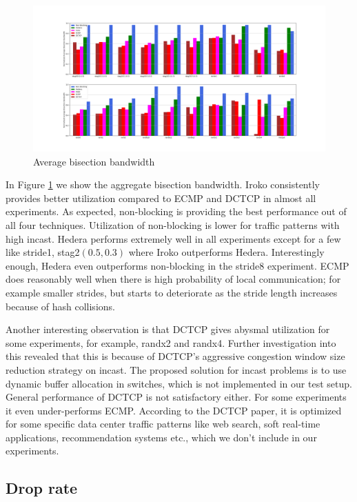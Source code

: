 \begin{figure}
	\centering
	\includegraphics[width=1\linewidth]{rate.png}
	\caption{Average bisection bandwidth}
	\label{fig:rate}
\end{figure}

In Figure \ref{fig:rate} we show the aggregate bisection bandwidth. Iroko
consistently provides better utilization compared to ECMP and DCTCP in almost
all experiments. As expected, non-blocking is providing the best performance out
of all four techniques. Utilization of non-blocking is lower for traffic
patterns with high incast. Hedera performs extremely well in all experiments
except for a few like stride1, stag2$(0.5,0.3)$ where Iroko outperforms Hedera.
Interestingly enough, Hedera even outperforms non-blocking in the stride8
experiment. ECMP does reasonably well when there is high probability of local
communication; for example smaller strides, but starts to deteriorate as the
stride length increases because of hash collisions.

Another interesting observation is that DCTCP gives abysmal utilization for some
experiments, for example, randx2 and randx4. Further investigation into this
revealed that this is because of DCTCP's aggressive congestion window size
reduction strategy on incast. The proposed solution for incast problems is to use
dynamic buffer allocation in switches, which is not implemented in our test
setup. General performance of DCTCP is not satisfactory either. For some
experiments it even under-performs ECMP.  According to the DCTCP paper, it is
optimized for some specific data center traffic patterns like web search, soft
real-time applications, recommendation systems etc., which we don't include in our
experiments.

\subsection{Drop rate}

